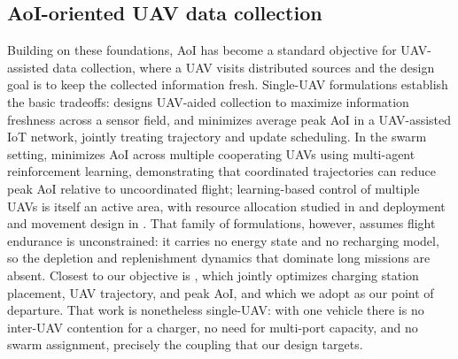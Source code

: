 \subsection{AoI-oriented UAV data collection}
Building on these foundations, AoI has become a standard objective for
UAV-assisted data collection, where a UAV visits distributed sources and the
design goal is to keep the collected information fresh. Single-UAV formulations
establish the basic tradeoffs: \cite{liu2021uav} designs UAV-aided collection to
maximize information freshness across a sensor field, and \cite{abdelmagid2019average}
minimizes average peak AoI in a UAV-assisted IoT network, jointly treating
trajectory and update scheduling. In the swarm setting, \cite{eldeeb2023swarm}
minimizes AoI across multiple cooperating UAVs using multi-agent reinforcement
learning, demonstrating that coordinated trajectories can reduce peak AoI
relative to uncoordinated flight; learning-based control of multiple UAVs is
itself an active area, with resource allocation studied in \cite{cui2020multiagent}
and deployment and movement design in \cite{liu2019rl}. That family of
formulations, however, assumes flight endurance is unconstrained: it carries no
energy state and no recharging model, so the depletion and replenishment
dynamics that dominate long missions are absent. Closest to our objective is
\cite{base2024}, which jointly optimizes charging station placement, UAV
trajectory, and peak AoI, and which we adopt as our point of departure. That
work is nonetheless single-UAV: with one vehicle there is no inter-UAV
contention for a charger, no need for multi-port capacity, and no swarm
assignment, precisely the coupling that our design targets.

